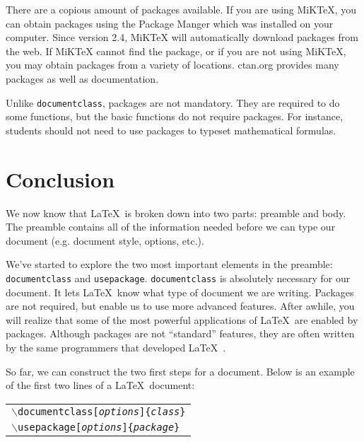 \documentclass{article}
\begin{document}
There are a copious amount of packages available. If you are using MiKTeX, you can obtain packages using the Package Manger which was installed on your computer. Since version 2.4, MiKTeX will automatically download packages from the web. If MiKTeX cannot find the package, or if you are not using MiKTeX, you may obtain packages from a variety of locations. ctan.org provides many packages as well as documentation.

Unlike \texttt{documentclass}, packages are not mandatory. They are required to do some functions, but the basic functions do not require packages. For instance, students should not need to use packages to typeset mathematical formulas.

\section{Conclusion}

We now know that \LaTeX\ is broken down into two parts: preamble and body. The preamble contains all of the information needed before we can type our document (e.g. document style, options, etc.).

We've started to explore the two most important elements in the preamble: \texttt{documentclass} and \texttt{usepackage}. \texttt{documentclass} is absolutely necessary for our document. It lets \LaTeX\ know what type of document we are writing. Packages are not required, but enable us to use more advanced features. After awhile, you will realize that some of the most powerful applications of \LaTeX\ are enabled by packages. Although packages are not ``standard'' features, they are often written by the same programmers that developed \LaTeX\ .

So far, we can construct the two first steps for a document. Below is an example of the first two lines of a \LaTeX\ document:
\begin{center}
	\begin{tabular}{l}
		\texttt{$\backslash$documentclass[\textit{options}]\{\textit{class}\}} \\
		\texttt{$\backslash$usepackage[\textit{options}]\{\textit{package}\}}
	\end{tabular}
\end{center}	
\end{document}
